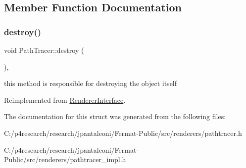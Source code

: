 \subsection{Member Function Documentation}
\mbox{\label{struct_path_tracer_a3c4e7e9eb10e92c6a6d5cc94bbf93ee7}} 
\subsubsection{\texorpdfstring{destroy()}{destroy()}}
{\footnotesize\ttfamily void Path\+Tracer\+::destroy (\begin{DoxyParamCaption}{ }\end{DoxyParamCaption})\hspace{0.3cm}{\ttfamily [inline]}, {\ttfamily [virtual]}}

this method is responsible for destroying the object itself 

Reimplemented from \hyperlink{struct_renderer_interface_a7469218aafa029a3e22bac2c00dca9f5}{Renderer\+Interface}.



The documentation for this struct was generated from the following files\+:\begin{DoxyCompactItemize}
\item 
C\+:/p4research/research/jpantaleoni/\+Fermat-\/\+Public/src/renderers/pathtracer.\+h\item 
C\+:/p4research/research/jpantaleoni/\+Fermat-\/\+Public/src/renderers/pathtracer\+\_\+impl.\+h\end{DoxyCompactItemize}
